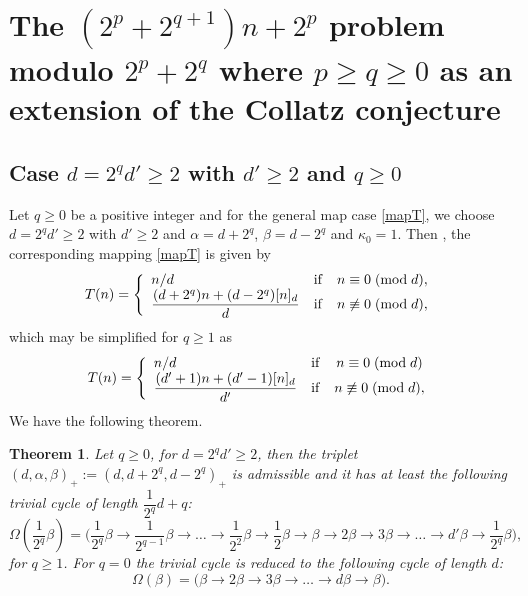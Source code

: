 \documentclass[11pt,a4paper]{article}
\newtheorem{theorem}{Theorem}[section]
\newcommand*\modd[3]{#1\equiv#2\;( {\rm mod}\;  #3)}
\newcommand*\notmodd[3]{#1\not\equiv#2\;( {\rm mod}\;  #3)}
\begin{document}
\section{ The $(2^p+2^{q+1})n+2^p$
	problem  modulo $2^p+2^q$ where $p\geq q\geq0$ as an extension of the Collatz conjecture}\label{sec:MainConjecture}
\subsection{Case $d=2^qd'\geq 2$ with $d'\geq 2$ and $q\geq 0$}

Let $q\geq 0$ be a positive integer and for the general map case \eqref{mapT}, we choose   $d=2^qd'\geq 2$ with $d'\geq 2$ and $ \alpha = d+2^q$,  $\beta = d-2^q$ and $\kappa_0=1$.  Then , the corresponding mapping \eqref{mapT}  is given by
\begin{equation}\label{map_d=2^qd'}
	T(n)=\left\{\begin{array}{lcc}
		n/d&\mathrm{if}& \modd{n}{0}{d},\\
		\dfrac{	(d+2^q) n+(d-2^q) [n]_d}{d}&\mathrm{if}& \notmodd{n}{0}{d},\\
	\end{array}\right.
\end{equation}
which may be simplified for $q\geq 1$ as
\begin{equation}\label{map_case4_0BisA^q}
	T(n)=\left\{\begin{array}{lcc}
		n/d&\mathrm{if}& \modd{n}{0}{d}\\
		\dfrac{	(d'+1) n+(d'-1) [n]_d}{d'}&\mathrm{if}& \notmodd{n}{0}{d},\\
	\end{array}\right.
\end{equation}
We have the following theorem.
\begin{theorem}\label{trivialcycleTheoremD+2^q}
	Let $q\geq 0$, for $d=2^qd'\geq 2$, then  the triplet  $(d,\alpha,\beta)_{\pmb{+}}:=(d,d+2^q,d-2^q)_{\pmb{+}}$ is  admissible and it  has at least  the following
	trivial cycle of length $\dfrac{1}{2^q}d+q$:
	\begin{equation}\label{Trivialcycle(d,d+2^q,d-2^q)}
		\Omega(\frac{1}{2^q}\beta)=\bigl(\frac{1}{2^q}\beta\rightarrow
		\frac{1}{2^{q-1}}\beta\rightarrow\ldots\rightarrow\frac{1}{2^2}\beta\rightarrow\frac{1}{2}\beta\rightarrow\beta\rightarrow 2\beta\rightarrow 3\beta\rightarrow  \ldots\rightarrow d'\beta\rightarrow \frac{1}{2^q}\beta\bigr),
	\end{equation}
	for $q\geq 1$. For  $q=0$ the trivial cycle  is  reduced to	the following cycle of length $d$:
	\begin{equation}\label{Trivialcycle(d,d+1,d-1)}
	\Omega(\beta)=\bigl(\beta\rightarrow 2\beta\rightarrow 3\beta\rightarrow  \ldots\rightarrow d\beta\rightarrow \beta\bigr).
	\end{equation}

	
\end{theorem}
\end{document}
